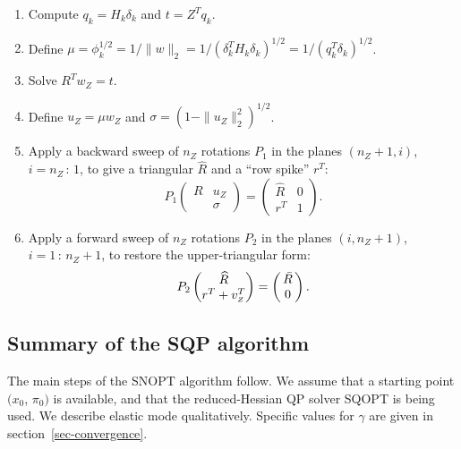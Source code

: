 \documentclass[draft,leqno,onefignum,onetabnum]{siamltex}
\def\norm#1{\|#1\|}
\def\Rbar{\skew5\bar R}
\def\Rhat{\widehat R}
\def\T{^T\!}
\def\Z{_{\scriptscriptstyle Z}}
\def\SNOPT {{\small SNOPT}}
\def\SQOPT {{\small SQOPT}}
\newcommand{\pmat}[1]{\begin{pmatrix}#1\end{pmatrix}}
\newcommand{\till}{\,{:}\,}                 %
\newcommand{\twonorm}[1]{\norm{#1}_2}
\begin{document}
\begin{enumerate}
 \item Compute $q_k = H_k \delta_k$ and $t = Z\T q_k$.

 \item Define $\mu = \phi_k^{1/2}
                   = 1/\twonorm{w} = 1/(\delta_k\T H_k  \delta_k)^{1/2}
                                   = 1/(           q_k\T\delta_k)^{1/2}$.

 \item Solve $R\T w\Z = t$.

 \item Define $u\Z = \mu w\Z$ and $\sigma = (1-\twonorm{u\Z}^2)^{1/2}$.

 \item Apply a backward sweep of $n\Z$ rotations $P_1$ in the planes
        $(n\Z+1, i)$, $i = n\Z\till 1$,
        to give a triangular $\Rhat$ and a ``row spike'' $r^T$:
\[
        P_1 \pmat{ R    &  u\Z   \\
                        &  \sigma }
          = \pmat{\Rhat &  0     \\
                   r^T  &  1      }.
\]

 \item Apply a forward sweep of $n\Z$ rotations $P_2$ in the planes
        $(i, n\Z+1)$, $i = 1\till n\Z+1$,
        to restore the upper-triangular form:
\[
        P_2 \pmat{ \Rhat      \\
                    r^T + v\Z^T }
          = \pmat{\, \Rbar \, \\ 0}.
\]
\end{enumerate}


\subsection{Summary of the SQP algorithm}  \label{sec-SQP-iteration}

The main steps of the \SNOPT{} algorithm follow.  We
assume that a starting point $(x_0$, $\pi_0)$ is available, and that the
reduced-Hessian QP solver \SQOPT{} is being used.
We describe elastic mode qualitatively.  Specific values for $\gamma$
are given in section~\ref{sec-convergence}.

\smallskip
\end{document}
